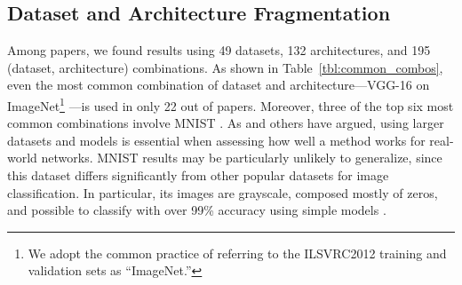 \subsection{Dataset and Architecture Fragmentation}





Among \npapers papers, we found results using 49 datasets, 132 architectures, and 195 (dataset, architecture) combinations. As shown in Table~\ref{tbl:common_combos}, even the most common combination of dataset and architecture---VGG-16 on ImageNet\footnote{We adopt the common practice of referring to the ILSVRC2012 training and validation sets as ``ImageNet.''} \cite{imagenet}---is used in only 22 out of \npapers papers. Moreover, three of the top six most common combinations involve MNIST \cite{mnist}. As \citet{google-state-of-sparsity} and others have argued, using larger datasets and models is essential when assessing how well a method works for real-world networks. MNIST results may be particularly unlikely to generalize, since this dataset differs significantly from other popular datasets for image classification. In particular, its images are grayscale, composed mostly of zeros, and possible to classify with over 99\% accuracy using simple models \cite{mnist-page}.

